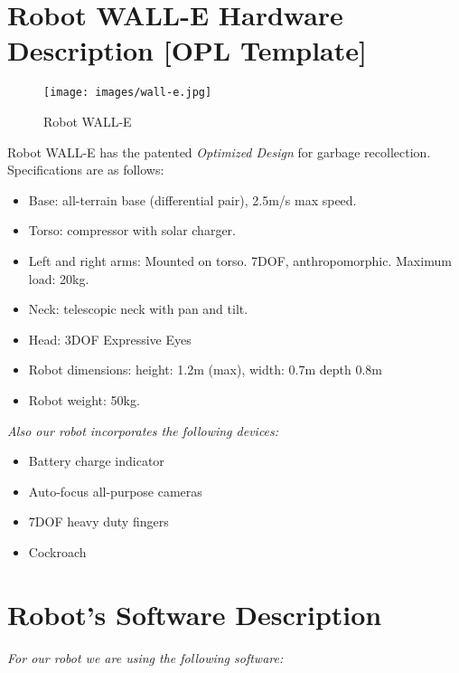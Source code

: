 \section{Robot WALL-E Hardware Description [OPL Template]}
\label{sec:annex-OPL}

\setlength\intextsep{0pt}
\begin{figure}
	\centering
	\texttt{[image: images/wall-e.jpg]}
	\caption{Robot WALL-E}
	\label{fig:wall-e}
\end{figure}

Robot WALL-E has the patented \textit{\BnL Optimized Design} for garbage recollection. Specifications are as follows:

\begin{itemize}
	\item Base: \BnL all-terrain base (differential pair), 2.5m/s max speed.
	\item Torso: \BnL compressor with solar charger.
	\item Left and right arms: Mounted on torso. \BnL 7DOF, anthropomorphic. Maximum load: 20kg.
	\item Neck: \BnL telescopic neck with pan and tilt.
	\item Head: 3DOF \BnL Expressive Eyes
	\item Robot dimensions: height: 1.2m (max), width: 0.7m depth 0.8m
	\item Robot weight: 50kg.
\end{itemize}

\noindent\textit{Also our robot incorporates the following devices:}

\begin{itemize}
	\item \BnL Battery charge indicator
	\item \BnL Auto-focus all-purpose cameras
	\item \BnL 7DOF heavy duty fingers
	\item \BnL Cockroach
\end{itemize}

\section*{Robot's Software Description}

\textit{For our robot we are using the following software:}

